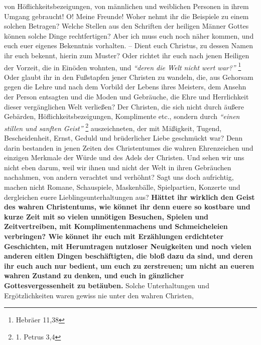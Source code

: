 von Höflichkeitsbezeigungen, von männlichen und weiblichen Personen in ihrem
Umgang gebraucht! O! Meine Freunde! Woher nehmt ihr die Beispiele zu einem
solchen Betragen? Welche Stellen aus den Schriften der heiligen Männer Gottes
können solche Dinge rechtfertigen? Aber ich muss euch noch näher kommen, und euch
euer eigenes Bekenntnis vorhalten. -- Dient euch Christus, zu dessen Namen ihr
euch bekennt, hierin zum Muster? Oder richtet ihr euch
nach jenen Heiligen der
Vorzeit, die in Einöden wohnten, und
\textit{"`deren die Welt nicht wert war?"'}
\footnote{Hebräer 11,38}
Oder glaubt ihr in den Fußstapfen jener Christen zu
wandeln, die, aus Gehorsam gegen die Lehre und nach dem Vorbild der Lebens
ihres Meisters, dem Ansehn der Person entsagten und die Moden und Gebräuche,
die Ehre und Herrlichkeit dieser vergänglichen Welt verließen? Der Christen, die
sich nicht durch äußere Gebärden, Höflichkeitsbezeigungen, Komplimente etc.,
sondern durch
\textit{"`einen stillen und sanften Geist"'}
\footnote{1. Petrus 3,4}
auszeichneten, der mit Mäßigkeit, Tugend,
Bescheidenheit, Ernst, Geduld und
brüderlicher Liebe geschmückt war? Denn darin bestanden in jenen Zeiten des
Christentumes die wahren Ehrenzeichen und einzigen Merkmale der Würde und des
Adels der Christen. Und sehen wir uns nicht eben darum, weil wir ihnen und nicht
der Welt in ihren Gebräuchen nachahmen, von andern verachtet und verhöhnt? Sagt
uns doch aufrichtig, machen nicht Romane,
Schauspiele, Maskenbälle,
Spielpartien, Konzerte und dergleichen euere
Lieblingsunterhaltungen aus? \label{ref:10_08_zeitvertreib} \textbf{Hättet ihr
wirklich den Geist des wahren Christentums, wie
könnet ihr denn euere so
kostbare und kurze Zeit mit so vielen unnötigen Besuchen,
Spielen und
Zeitvertreiben, mit Komplimentenmachens und Schmeicheleien
verbringen? Wie
könnet ihr euch mit Erzählungen erdichteter
Geschichten, mit Herumtragen
nutzloser Neuigkeiten und noch vielen anderen eitlen
Dingen beschäftigten, die
bloß dazu da sind, und deren ihr euch auch nur bedient, um euch zu
zerstreuen;
um nicht an eueren wahren Zustand zu denken, und euch in gänzlicher
Gottesvergessenheit zu
betäuben.} Solche Unterhaltungen und Ergötzlichkeiten
waren gewiss nie unter den wahren Christen,

